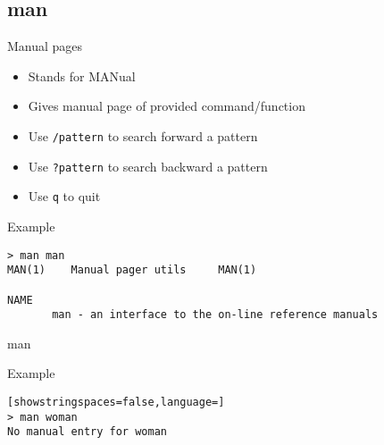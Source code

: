 \subsection{man}

\begin{frame}[fragile]{Manual pages}
  \begin{itemize}
    \pause \item Stands for MANual
    \pause \item Gives manual page of provided command/function
    \pause \item Use \texttt{/pattern} to search forward a pattern
    \pause \item Use \texttt{?pattern} to search backward a pattern
    \pause \item Use \texttt{q} to quit
  \end{itemize}
  \pause

  \begin{exampleblock}{Example}
    \begin{lstlisting}[showstringspaces=false,basicstyle=\tiny]
> man man
MAN(1)    Manual pager utils     MAN(1)

NAME
       man - an interface to the on-line reference manuals
    \end{lstlisting}
  \end{exampleblock}
\end{frame}

\begin{frame}[fragile]{man}
  \begin{exampleblock}{Example}
    \begin{lstlisting}[showstringspaces=false,language=]
> man woman
No manual entry for woman
    \end{lstlisting}
  \end{exampleblock}
\end{frame}
